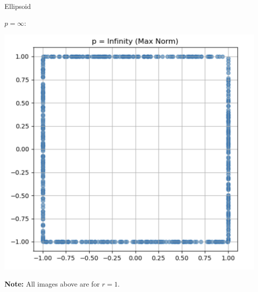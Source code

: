 \begin{ex}[Ellipsoid]{Ellipsoid}
\begin{itemize}
\begin{minipage}{0.33\textwidth}
\begin{center}
                \end{center}
        \end{minipage}
        \begin{minipage}{0.33\textwidth}
            \item 
                $p = \infty$: 
                \begin{center}
                    \hspace{-1.5cm}\includegraphics[scale = 0.2]{Images/Fundamental/MaxBall.png}
                \end{center}
        \end{minipage}
    \end{itemize}

    \textbf{Note:} All images above are for $r = 1$.
\end{ex}

